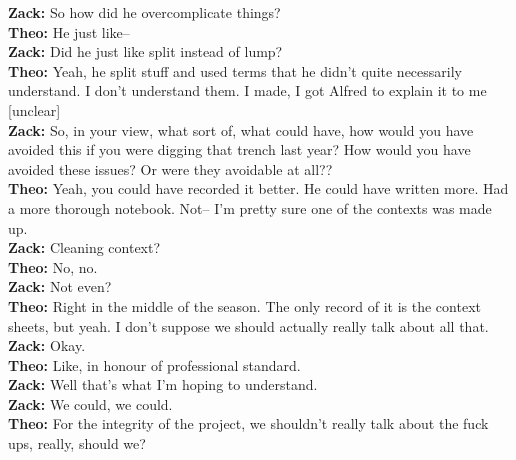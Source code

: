 \begin{arefs}
\textbf{Zack:} So how did he overcomplicate things?\\
\textbf{Theo:} He just like--\\
\textbf{Zack:} Did he just like split instead of lump?\\
\textbf{Theo:} Yeah, he split stuff and used terms that he didn't quite necessarily understand. I don't understand them. I made, I got Alfred to explain it to me [unclear]\\
\textbf{Zack:} So, in your view, what sort of, what could have, how would you have avoided this if you were digging that trench last year? How would you have avoided these issues? Or were they avoidable at all??\\
\textbf{Theo:} Yeah, you could have recorded it better. He could have written more. Had a more thorough notebook. Not-- I'm pretty sure one of the contexts was made up.\\
\textbf{Zack:} Cleaning context?\\
\textbf{Theo:} No, no.\\
\textbf{Zack:} Not even?\\
\textbf{Theo:} Right in the middle of the season. The only record of it is the context sheets, but yeah. I don't suppose we should actually really talk about all that.\\
\textbf{Zack:} Okay.\\
\textbf{Theo:} Like, in honour of professional standard.\\
\textbf{Zack:} Well that's what I'm hoping to understand.\\
\textbf{Zack:} We could, we could.\\
\textbf{Theo:} For the integrity of the project, we shouldn't really talk about the fuck ups, really, should we?


\end{arefs}
